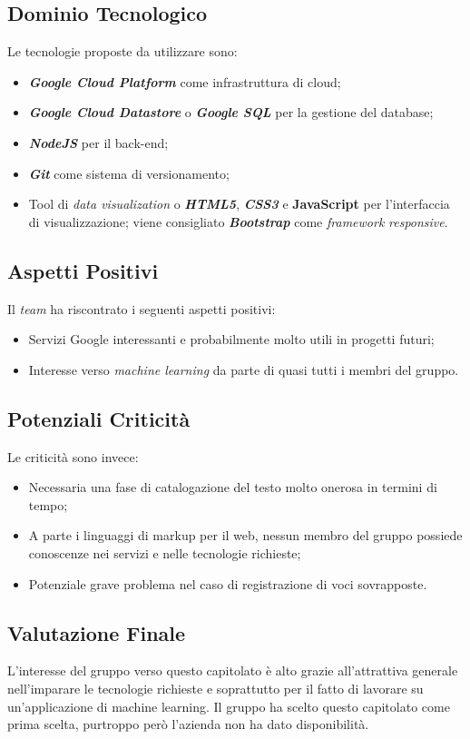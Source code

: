 \subsection{Dominio Tecnologico}
Le tecnologie proposte da utilizzare sono:
\begin{itemize}
	\item \textit{\textbf{Google Cloud Platform}} come infrastruttura di cloud;
	\item \textbf{\textit{Google Cloud Datastore}} o \textbf{\textit{Google SQL}} per la gestione del database;
	\item \textbf{\textit{NodeJS}} per il back-end;
	\item \textbf{\textit{Git}} come sistema di versionamento;
	\item Tool di \textit{data visualization} o \textbf{\textit{HTML5}}, \textbf{\textit{CSS3}} e \textbf{JavaScript} per l'interfaccia di visualizzazione; viene consigliato \textbf{\textit{Bootstrap}} come \textit{framework} \textit{responsive}.
\end{itemize}

\subsection{Aspetti Positivi}
Il \textit{team} ha riscontrato i seguenti aspetti positivi:
\begin{itemize}
	\item Servizi Google interessanti e probabilmente molto utili in progetti futuri;
	\item Interesse verso \textit{machine learning} da parte di quasi tutti i membri del gruppo.
\end{itemize}

\subsection{Potenziali Criticità}
Le criticità sono invece:
\begin{itemize}
	\item Necessaria una fase di catalogazione del testo molto onerosa in termini di tempo;
	\item A parte i linguaggi di markup per il web, nessun membro del gruppo possiede conoscenze nei servizi e nelle tecnologie richieste;
	\item Potenziale grave problema nel caso di registrazione di voci sovrapposte.
\end{itemize}

\subsection{Valutazione Finale}
L'interesse del gruppo verso questo capitolato è alto grazie all'attrattiva generale nell'imparare le tecnologie richieste e soprattutto per il fatto di lavorare su un'applicazione di machine learning.
Il gruppo ha scelto questo capitolato come prima scelta, purtroppo però l'azienda non ha dato disponibilità.

